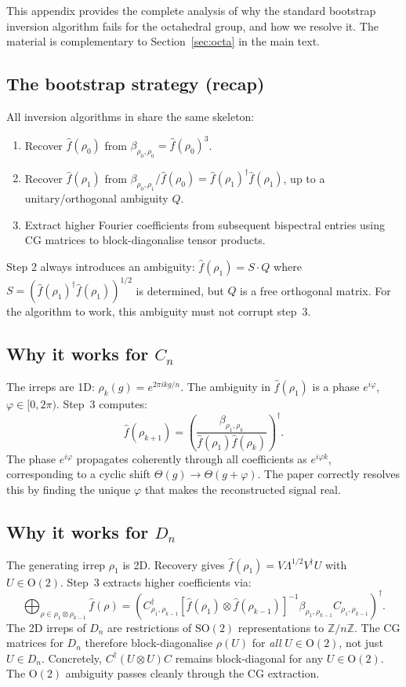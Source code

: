 \documentclass{article}
\theoremstyle{definition}
\theoremstyle{remark}
\newcommand{\SO}{\mathrm{SO}}
\newcommand{\OG}{\mathrm{O}}
\theoremstyle{definition}
\begin{document}
This appendix provides the complete analysis of why the standard
bootstrap inversion algorithm fails for the octahedral group, and how
we resolve it. The material is complementary to
Section~\ref{sec:octa} in the main text.

\subsection{The bootstrap strategy (recap)}

All inversion algorithms in \citet{mataigne2024selective} share the
same skeleton:
\begin{enumerate}[nosep]
  \item Recover $\hat{f}(\rho_0)$ from
    $\beta_{\rho_0,\rho_0} = \hat{f}(\rho_0)^3$.
  \item Recover $\hat{f}(\rho_1)$ from
    $\beta_{\rho_0,\rho_1}/\hat{f}(\rho_0)
    = \hat{f}(\rho_1)^\dagger \hat{f}(\rho_1)$,
    up to a unitary/orthogonal ambiguity $Q$.
  \item Extract higher Fourier coefficients from subsequent bispectral
    entries using CG matrices to block-diagonalise tensor products.
\end{enumerate}
Step 2 always introduces an ambiguity:
$\hat{f}(\rho_1) = S \cdot Q$ where
$S = (\hat{f}(\rho_1)^\dagger \hat{f}(\rho_1))^{1/2}$ is determined,
but $Q$ is a free orthogonal matrix. For the algorithm to work, this
ambiguity must not corrupt step~3.

\subsection{Why it works for $C_n$}

The irreps are 1D: $\rho_k(g) = e^{2\pi i k g / n}$. The ambiguity in
$\hat{f}(\rho_1)$ is a phase $e^{i\varphi}$,
$\varphi \in [0, 2\pi)$. Step~3 computes:
\[
  \hat{f}(\rho_{k+1}) = \left(\frac{\beta_{\rho_1, \rho_k}}{
    \hat{f}(\rho_1) \hat{f}(\rho_k)}\right)^\dagger.
\]
The phase $e^{i\varphi}$ propagates coherently through all coefficients
as $e^{i\varphi k}$, corresponding to a cyclic shift
$\Theta(g) \to \Theta(g + \varphi)$. The paper correctly resolves this
by finding the unique $\varphi$ that makes the reconstructed signal
real.

\subsection{Why it works for $D_n$}

The generating irrep $\rho_1$ is 2D. Recovery gives
$\hat{f}(\rho_1) = V\Lambda^{1/2}V^\dagger U$ with
$U \in \OG(2)$. Step~3 extracts higher coefficients via:
\[
  \bigoplus_{\rho \in \rho_1 \otimes \rho_{k-1}} \hat{f}(\rho)
  = \left(C_{\rho_1,\rho_{k-1}}^\dagger
    \left[\hat{f}(\rho_1) \otimes \hat{f}(\rho_{k-1})\right]^{-1}
    \beta_{\rho_1,\rho_{k-1}}
    C_{\rho_1,\rho_{k-1}}\right)^\dagger.
\]
The 2D irreps of $D_n$ are restrictions of $\SO(2)$ representations
to $\mathbb{Z}/n\mathbb{Z}$. The CG matrices for $D_n$ therefore
block-diagonalise $\rho(U)$ for \emph{all} $U \in \OG(2)$, not just
$U \in D_n$. Concretely, $C^\dagger(U \otimes U)C$ remains
block-diagonal for any $U \in \OG(2)$. The $\OG(2)$ ambiguity passes
cleanly through the CG extraction.
\end{document}
